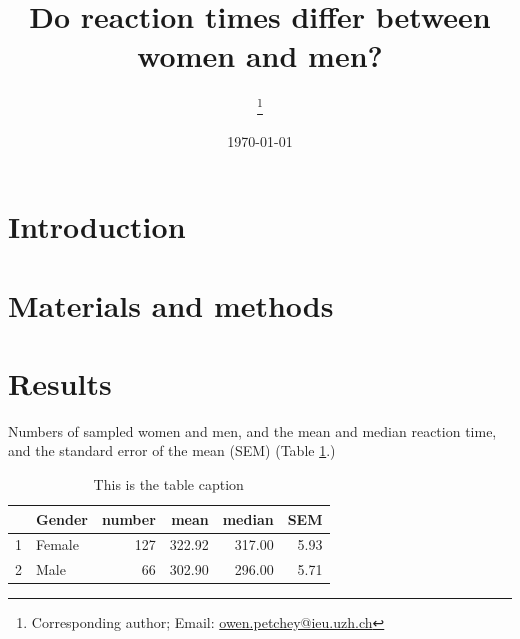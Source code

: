 \documentclass[12pt,halfline,a4paper,]{ouparticle}
\begin{document}
\title{Do reaction times differ between women and men?}

\author{%
\address{University of Zurich}\thanks{Corresponding author; Email: \href{mailto:owen.petchey@ieu.uzh.ch}{owen.petchey@ieu.uzh.ch}}
\and
{}\address{Your University}
}


\date{\today}


\maketitle



\hypertarget{introduction}{%
\section{Introduction}\label{introduction}}

\hypertarget{materials-and-methods}{%
\section{Materials and methods}\label{materials-and-methods}}

\hypertarget{results}{%
\section{Results}\label{results}}

Numbers of sampled women and men, and the mean and median reaction time,
and the standard error of the mean (SEM) (Table
\ref{tab:summary-stats}.)

\begin{table}[ht]
\centering
\begin{tabular}{rlrrrr}
  \hline
 & Gender & number & mean & median & SEM \\ 
  \hline
1 & Female & 127 & 322.92 & 317.00 & 5.93 \\ 
  2 & Male &  66 & 302.90 & 296.00 & 5.71 \\ 
   \hline
\end{tabular}
\caption{This is the table caption} 
\label{tab:summary-stats}
\end{table}
\end{document}
